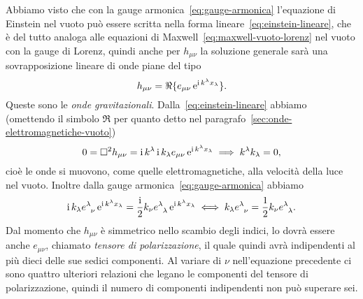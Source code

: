 Abbiamo visto che con la gauge armonica~\eqref{eq:gauge-armonica} l'equazione di
Einstein nel vuoto può essere scritta nella forma
lineare~\eqref{eq:einstein-lineare}, che è del tutto analoga alle equazioni di
Maxwell~\eqref{eq:maxwell-vuoto-lorenz} nel vuoto con la gauge di Lorenz, quindi
anche per $h_{\mu\nu}$ la soluzione generale sarà una sovrapposizione lineare di
onde piane del tipo
\begin{equation}
  h_{\mu\nu} = \Re\{e_{\mu\nu} \operatorname{\mathrm{e}}^{\operatorname{\mathrm{i}} k^{\lambda}x_{\lambda}} \}.
\end{equation}
Queste sono le \emph{onde gravitazionali}.
Dalla~\eqref{eq:einstein-lineare} abbiamo (omettendo il simbolo $\Re$ per quanto
detto nel paragrafo~\ref{sec:onde-elettromagnetiche-vuoto})
\begin{equation}
  0 = \Box^{2} h_{\mu\nu} = \operatorname{\mathrm{i}} k^{\lambda} \operatorname{\mathrm{i}} k_{\lambda} e_{\mu\nu}
  \operatorname{\mathrm{e}}^{\operatorname{\mathrm{i}} k^{\lambda}x_{\lambda}} \implies k^{\lambda}k_{\lambda} = 0,
\end{equation}
cioè le onde si muovono, come quelle elettromagnetiche, alla velocità della luce
nel vuoto.  Inoltre dalla gauge armonica~\eqref{eq:gauge-armonica} abbiamo
\begin{equation}
  \uimm k_{\lambda} \tensor{e}{^{\lambda}_{\nu}} \e^{\uimm
    k^{\lambda}x_{\lambda}} = \frac{\uimm}{2} k_{\nu}
  \tensor{e}{^{\lambda}_{\lambda}} \e^{\uimm k^{\lambda}x_{\lambda}} \iff
  k_{\lambda} \tensor{e}{^{\lambda}_{\nu}} = \frac{1}{2} k_{\nu}
  \tensor{e}{^{\lambda}_{\lambda}}.
\end{equation}
Dal momento che $h_{\mu\nu}$ è simmetrico nello scambio degli indici, lo dovrà
essere anche $e_{\mu\nu}$, chiamato 
\emph{tensore di polarizzazione}, il quale quindi avrà indipendenti al più dieci
delle sue sedici componenti.  Al variare di $\nu$ nell'equazione precedente ci
sono quattro ulteriori relazioni che legano le componenti del tensore di
polarizzazione, quindi il numero di componenti indipendenti non può superare
sei.

